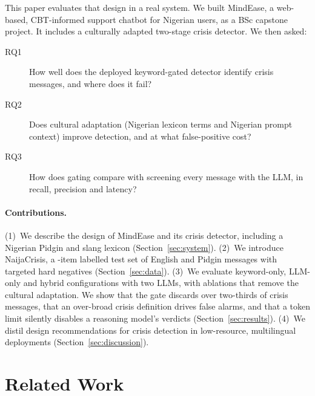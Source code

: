 This paper evaluates that design in a real system. We built MindEase, a web-based, CBT-informed support chatbot for Nigerian users, as a BSc capstone project. It includes a culturally adapted two-stage crisis detector. We then asked:

\begin{description}
  \item[RQ1] How well does the deployed keyword-gated detector identify crisis messages, and where does it fail?
  \item[RQ2] Does cultural adaptation (Nigerian lexicon terms and Nigerian prompt context) improve detection, and at what false-positive cost?
  \item[RQ3] How does gating compare with screening every message with the LLM, in recall, precision and latency?
\end{description}

\paragraph{Contributions.} (1)~We describe the design of MindEase and its crisis detector, including a Nigerian Pidgin and slang lexicon (Section~\ref{sec:system}). (2)~We introduce NaijaCrisis, a \Nitems-item labelled test set of English and Pidgin messages with targeted hard negatives (Section~\ref{sec:data}). (3)~We evaluate keyword-only, LLM-only and hybrid configurations with two LLMs, with ablations that remove the cultural adaptation. We show that the gate discards over two-thirds of crisis messages, that an over-broad crisis definition drives false alarms, and that a token limit silently disables a reasoning model's verdicts (Section~\ref{sec:results}). (4)~We distil design recommendations for crisis detection in low-resource, multilingual deployments (Section~\ref{sec:discussion}).

\section{Related Work}

